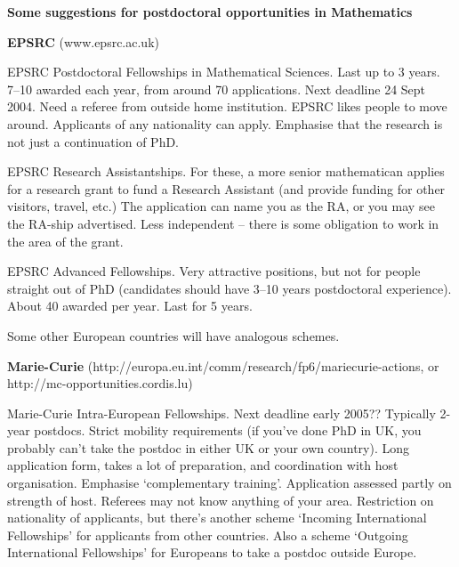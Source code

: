 


{\bf Some suggestions for postdoctoral opportunities in Mathematics}

\smallskip

{\bf EPSRC} (www.epsrc.ac.uk)

\smallskip

 EPSRC Postdoctoral Fellowships in Mathematical Sciences. Last up to 3 years. 7--10
 awarded each year, from around 70 applications. 
Next deadline  24 Sept 2004. Need a referee from outside home institution. 
EPSRC likes people to move around. Applicants of any nationality can apply. Emphasise 
that the research is not just a continuation of PhD.

\smallskip

EPSRC Research Assistantships. For these, a more senior mathematican applies for a research grant
to fund a Research Assistant (and provide funding for other visitors, travel, etc.)
 The application can name you
as the RA, or you may see the RA-ship advertised. Less independent -- there is some 
obligation to work in the area of the grant.

\smallskip

EPSRC Advanced Fellowships. Very attractive positions, but not for people straight out of PhD
(candidates should have 3--10 years postdoctoral experience). About 40 awarded per year.
 Last for 5 years.

\smallskip

Some other European countries will have analogous schemes.

\medskip


{\bf Marie-Curie} (http://europa.eu.int/comm/research/fp6/mariecurie-actions, or
http://mc-opportunities.cordis.lu)

\smallskip

Marie-Curie Intra-European Fellowships. Next deadline early 2005?? Typically 2-year postdocs.
Strict mobility requirements (if you've done PhD in UK, you probably can't take the postdoc in
either UK or your own country). Long application form, takes a lot of preparation, and coordination 
with host organisation. Emphasise `complementary training'. Application assessed partly on 
strength of host. 
Referees may not know anything of your area. Restriction on nationality of applicants, but there's 
another scheme `Incoming International Fellowships' for applicants from other countries. Also a scheme
`Outgoing International Fellowships' for Europeans to take a postdoc outside Europe. 


